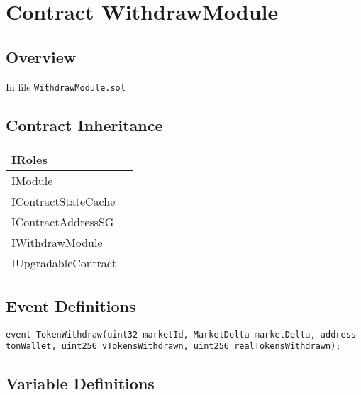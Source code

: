 
\chapter{Contract WithdrawModule}

\minitoc

\section{Overview}


In file {\tt WithdrawModule.sol}

\section{Contract Inheritance}


\noindent\begin{tabular}{|l|p{5cm}|}\hline
IRoles & \\\hline
IModule & \\\hline
IContractStateCache & \\\hline
IContractAddressSG & \\\hline
IWithdrawModule & \\\hline
IUpgradableContract & \\\hline
\end{tabular}


\section{Event Definitions}


\begin{lstlisting}[firstnumber=18]
    event TokenWithdraw(uint32 marketId, MarketDelta marketDelta, address tonWallet, uint256 vTokensWithdrawn, uint256 realTokensWithdrawn);
\end{lstlisting}

\section{Variable Definitions}



